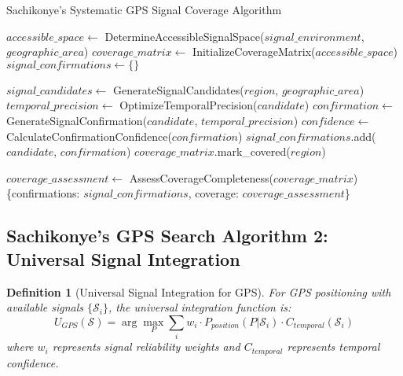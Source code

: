 \documentclass[12pt,a4paper]{article}
\newtheorem{definition}{Definition}
\begin{document}
\begin{algorithm}
\caption{Sachikonye's Systematic GPS Signal Coverage Algorithm}
\begin{algorithmic}
    \State $accessible\_space \gets$ DetermineAccessibleSignalSpace($signal\_environment$, $geographic\_area$)
    \State $coverage\_matrix \gets$ InitializeCoverageMatrix($accessible\_space$)
    \State $signal\_confirmations \gets \{\}$
    
        \State $signal\_candidates \gets$ GenerateSignalCandidates($region$, $geographic\_area$)
            \State $temporal\_precision \gets$ OptimizeTemporalPrecision($candidate$)
            \State $confirmation \gets$ GenerateSignalConfirmation($candidate$, $temporal\_precision$)
            \State $confidence \gets$ CalculateConfirmationConfidence($confirmation$)
                \State $signal\_confirmations$.add($candidate$, $confirmation$)
                \State $coverage\_matrix$.mark\_covered($region$)
            \EndIf
        \EndFor
    \EndFor
    
    \State $coverage\_assessment \gets$ AssessCoverageCompleteness($coverage\_matrix$)
    \State \Return \{confirmations: $signal\_confirmations$, coverage: $coverage\_assessment$\}
\EndProcedure
\end{algorithmic}
\end{algorithm}

\subsection{Sachikonye's GPS Search Algorithm 2: Universal Signal Integration}

\begin{definition}[Universal Signal Integration for GPS]
For GPS positioning with available signals $\{\mathcal{S}_i\}$, the universal integration function is:
\begin{equation}
U_{GPS}(\mathcal{S}) = \arg\max_P \sum_{i} w_i \cdot P_{position}(P | \mathcal{S}_i) \cdot C_{temporal}(\mathcal{S}_i)
\end{equation}
where $w_i$ represents signal reliability weights and $C_{temporal}$ represents temporal confidence.
\end{definition}
\end{document}
